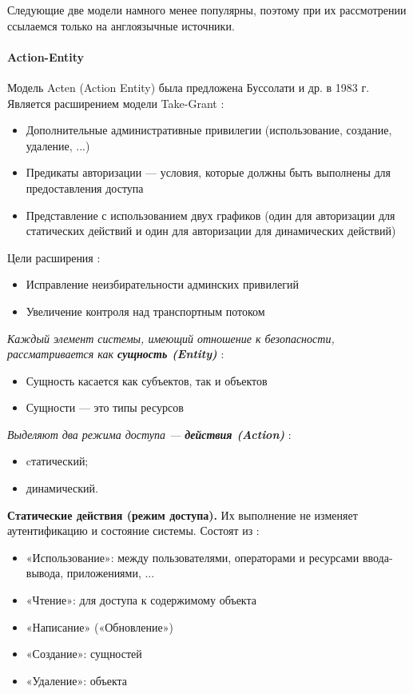 Следующие две модели намного менее популярны, поэтому при их рассмотрении ссылаемся только на англоязычные
источники.

\paragraph{Action-Entity}

Модель Acten (Action Entity) была предложена Буссолати и др. \autocite{Jalili} в 1983 г. Является расширением
модели Take-Grant \autocite{SecModels}:
\begin{itemize}
    \item Дополнительные административные привилегии (использование, создание, удаление, ...)
    \item Предикаты авторизации --- условия, которые должны быть выполнены для предоставления доступа
    \item Представление с использованием двух графиков (один для авторизации для статических действий и один
    для авторизации для динамических действий)
\end{itemize}
Цели расширения \autocite{Jalili}:
\begin{itemize}
    \item Исправление неизбирательности админских привилегий
    \item Увеличение контроля над транспортным потоком
\end{itemize}

\textit{Каждый элемент системы, имеющий отношение к безопасности, рассматривается как \textbf{сущность (Entity)}} \autocite{Jalili}:
\begin{itemize}
    \item Сущность касается как субъектов, так и объектов
    \item Сущности --- это типы ресурсов
\end{itemize}

\textit{Выделяют два режима доступа --- \textbf{действия (Action)}} \autocite{Jalili}:
\begin{itemize}
    \item cтатический;
    \item динамический.
\end{itemize}

\textbf{Статические действия (режим доступа).} Их выполнение не изменяет аутентификацию и состояние системы.
Состоят из \autocite{SecModels}:
\begin{itemize}
    \item «Использование»: между пользователями, операторами и ресурсами ввода-вывода, приложениями, ...
    \item «Чтение»: для доступа к содержимому объекта
    \item «Написание» («Обновление»)
    \item «Создание»: сущностей
    \item «Удаление»: объекта
\end{itemize}

